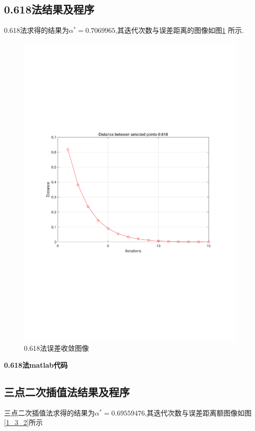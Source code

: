     \subsection{0.618法结果及程序}
    0.618法求得的结果为$ \alpha^*=0.7069965 $,其迭代次数与误差距离的图像如图\ref{1_0.618}
    所示.
    \begin{figure}[htbp!]
        \centering
        \includegraphics[width = 14cm]{第一题-0.618.pdf}
        \caption[]{0.618法误差收敛图像}\label{1_0.618}
    \end{figure} 

    \begin{center}
            \textbf{0.618法matlab代码}
    \end{center}

    

    \subsection{三点二次插值法结果及程序}
    三点二次插值法求得的结果为$ \alpha^*=0.69559476 $,其迭代次数与误差距离额图像如图\ref{1_3_2}所示

